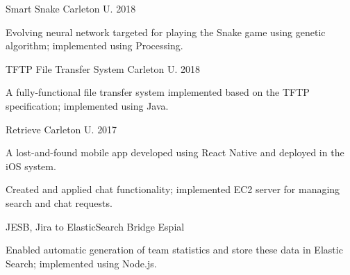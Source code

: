 \begin{cventries}

\cventry
{\textnormal{}}
{Smart Snake}
{Carleton U.}
{2018}
{\begin{cvitems}
    \item {Evolving neural network targeted for playing the Snake game using genetic algorithm; implemented using Processing.}
\end{cvitems}}

\cventry
{\textnormal{}}
{TFTP File Transfer System}
{Carleton U.}
{2018}
{\begin{cvitems}
    \item {A fully-functional file transfer system implemented based on the TFTP specification; implemented using Java.}
\end{cvitems}}

\cventry
{\textnormal{}}
{Retrieve}
{Carleton U.}
{2017}
{\begin{cvitems}
    \item {A lost-and-found mobile app developed using React Native and deployed in the iOS system.}
    \item {Created and applied chat functionality; implemented EC2 server for managing search and chat requests.}
\end{cvitems}}

\cvshortentry
{JESB, Jira to ElasticSearch Bridge}
{Espial}
{\begin{cvitems}
    \item {Enabled automatic generation of team statistics and store these data in Elastic Search; implemented using Node.js.}
\end{cvitems}}

\end{cventries}

